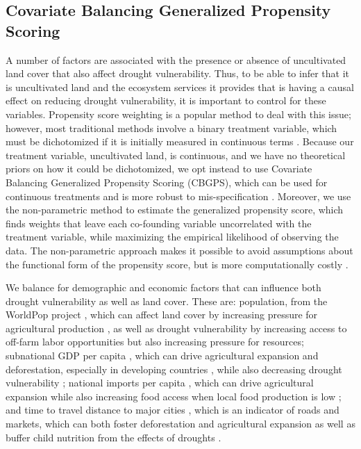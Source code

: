 \documentclass{article}
\begin{document}
\subsection{Covariate Balancing Generalized Propensity Scoring}
A number of factors are associated with the presence or absence of uncultivated land cover that also affect drought vulnerability.  Thus, to be able to infer that it is uncultivated land and the ecosystem services it provides that is having a causal effect on reducing drought vulnerability, it is important to control for these variables.  Propensity score weighting is a popular method to deal with this issue; however, most traditional methods involve a binary treatment variable, which must be dichotomized if it is initially measured in continuous terms \cite{Hirano2003, Robins2000}.  Because our treatment variable, uncultivated land, is continuous, and we have no theoretical priors on how it could be dichotomized, we opt instead to use Covariate Balancing Generalized Propensity Scoring (CBGPS), which can be used for continuous treatments and is more robust to mis-specification \cite{Fong2018}.  Moreover, we use the non-parametric method to estimate the generalized propensity score, which finds weights that leave each co-founding variable uncorrelated with the treatment variable, while maximizing the empirical likelihood of observing the data.  The non-parametric approach makes it possible to avoid assumptions about the functional form of the propensity score, but is more computationally costly \cite{Fong2018}.

We balance for demographic and economic factors that can influence both drought vulnerability as well as land cover.  These are: population, from the WorldPop project \cite{Tatem2017}, which can affect land cover by increasing pressure for agricultural production \citep{ouedraogo2010land}, as well as drought vulnerability by increasing access to off-farm labor opportunities but also increasing pressure for resources; subnational GDP per capita \cite{Kummu2018}, which can drive agricultural expansion and deforestation, especially in developing countries \citep{culas2012redd}, while also decreasing drought vulnerability \citep{Carrao2016}; national imports per capita \cite{WorldBank2017}, which can drive agricultural expansion \cite{Meyfroidt2013} while also increasing food access when local food production is low \citep{janssens2020global}; and time to travel distance to major cities \cite{Weiss2018, Uchida2008}, which is an indicator of roads and markets, which can both foster deforestation and agricultural expansion \citep{barber2014roads} as well as buffer child nutrition from the effects of droughts \citep{Shively2017}.
\end{document}
